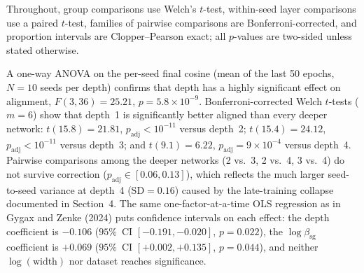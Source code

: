 %



Throughout, group comparisons use Welch's $t$-test, within-seed layer
comparisons use a paired $t$-test, families of pairwise comparisons are
Bonferroni-corrected, and proportion intervals are Clopper--Pearson exact;
all $p$-values are two-sided unless stated otherwise.



A one-way ANOVA on the per-seed final cosine (mean of the last 50 epochs,
$N = 10$ seeds per depth) confirms that depth has a highly significant effect
on alignment, $F(3, 36) = 25.21$, $p = 5.8 \times 10^{-9}$. Bonferroni-corrected
Welch $t$-tests ($m = 6$) show that depth~1 is significantly better aligned
than every deeper network: $t(15.8) = 21.81$, $p_{\mathrm{adj}} < 10^{-11}$
versus depth~2; $t(15.4) = 24.12$, $p_{\mathrm{adj}} < 10^{-11}$ versus
depth~3; and $t(9.1) = 6.22$, $p_{\mathrm{adj}} = 9 \times 10^{-4}$ versus
depth~4. Pairwise comparisons among the deeper networks (2 vs.\ 3, 2 vs.\ 4,
3 vs.\ 4) do not survive correction ($p_{\mathrm{adj}} \in [0.06, 0.13]$),
which reflects the much larger seed-to-seed variance at depth~4
($\mathrm{SD} = 0.16$) caused by the late-training collapse documented in
Section~4. The same one-factor-at-a-time OLS regression as in
Gygax and Zenke (2024) puts confidence intervals on each effect:
the depth coefficient is $-0.106$ ($95\%$~CI $[-0.191, -0.020]$, $p = 0.022$),
the $\log\beta_{\mathrm{sg}}$ coefficient is $+0.069$
($95\%$~CI $[+0.002, +0.135]$, $p = 0.044$), and neither $\log(\text{width})$
nor dataset reaches significance.


